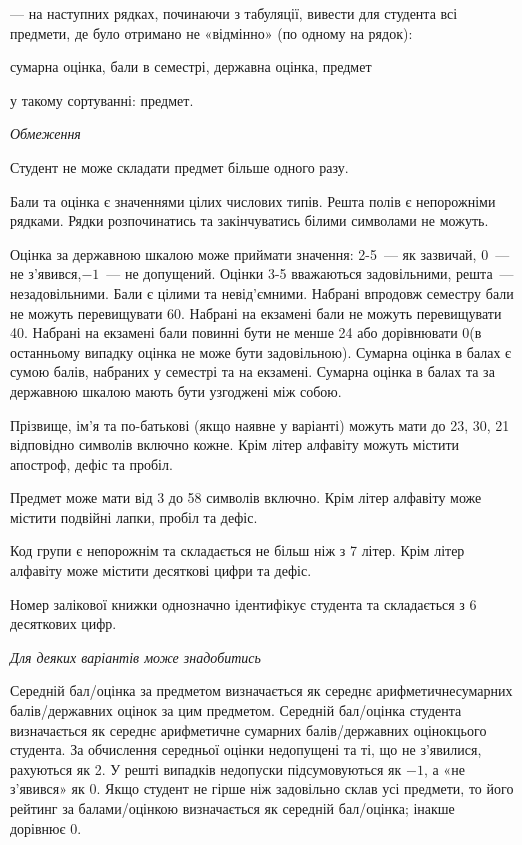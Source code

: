 \documentclass[11pt, ukrainian]{article}
\begin{document}
{\noindent}--- на наступних рядках, починаючи з табуляції, вивести для студента всі предмети, де було отримано не «відмінно» (по одному на рядок):\par
сумарна оцінка, бали в семестрі, державна оцінка, предмет

{\noindent}у такому сортуванні: предмет.


\bigskip\textit{Обмеження}

Студент не може складати предмет більше одного разу.

Бали та оцінка є значеннями цілих числових типів. Решта полів є непорожніми рядками.
Рядки розпочинатись та закінчуватись білими символами не можуть.

Оцінка за державною шкалою може приймати значення: 2-5~--- як зазвичай, 0~--- не з’явився,$-1$~--- не допущений. 
Оцінки 3-5 вважаються задовільними, решта~--- незадовільними. 
Бали є цілими та невід’ємними.
Набрані впродовж семестру бали не можуть перевищувати 60. 
Набрані на екзамені бали не можуть перевищувати 40. 
Набрані на екзамені бали повинні бути не менше 24 або дорівнювати 0(в останньому випадку оцінка не може бути задовільною). 
Сумарна оцінка в балах є сумою балів, набраних у семестрі та на екзамені.
Сумарна оцінка в балах та за державною шкалою мають бути узгоджені між собою.

Прізвище, ім’я та по-батькові (якщо наявне у варіанті) можуть мати до 23, 30, 21 відповідно символів включно кожне. 
Крім літер алфавіту можуть містити апостроф, дефіс та пробіл.

Предмет може мати від 3 до 58 символів включно. 
Крім літер алфавіту може містити подвійні лапки, пробіл та дефіс.

Код групи є непорожнім та складається не більш ніж з 7 літер. 
Крім літер алфавіту може містити десяткові цифри та дефіс.


Номер залікової книжки однозначно ідентифікує студента та складається з 6 десяткових цифр. 

\bigskip\textit{Для деяких варіантів може знадобитись}

Середній бал/оцінка за предметом визначається як середнє арифметичнесумарних балів/державних оцінок за цим предметом. 
Середній бал/оцінка студента визначається як середнє арифметичне сумарних балів/державних оцінокцього студента. 
За обчислення середньої оцінки недопущені та ті, що не з’явилися, рахуються як 2.
У решті випадків недопуски підсумовуються як $-1$, а «не з’явився» як 0.
Якщо студент не гірше ніж задовільно склав усі предмети, 
то його рейтинг за балами/оцінкою визначається як середній бал/оцінка; інакше дорівнює 0.
\end{document}
